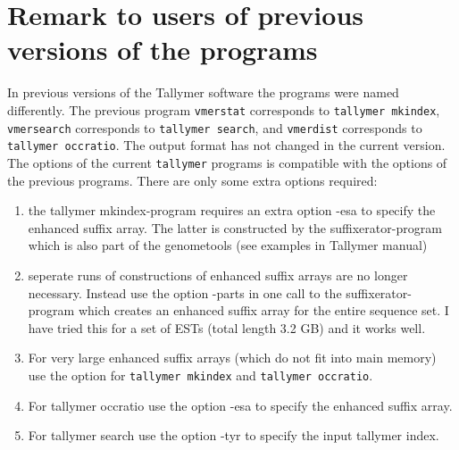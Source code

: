 \documentclass[12pt]{article}
\newcommand{\Programname}[1]{\texttt{\small #1}}
\newcommand{\Tallymer}[0]{\Programname{tallymer}\xspace}
\begin{document}
\section{Remark to users of previous versions of the programs}
In previous versions of the Tallymer software the programs were 
named differently. The previous program \texttt{vmerstat}
corresponds to \texttt{tallymer mkindex}, \texttt{vmersearch}
corresponds to \texttt{tallymer search}, and \texttt{vmerdist}
corresponds to \texttt{tallymer occratio}. The output format
has not changed in the current version. The options of the
current \Tallymer programs is compatible with the options of the
previous programs. There are only some extra options required:
\begin{enumerate}
\item
the tallymer mkindex-program requires an extra option -esa to
specify the enhanced suffix array. The latter is
constructed by the suffixerator-program which is also part
of the genometools (see examples in Tallymer manual)
\item
seperate runs of constructions of enhanced suffix arrays are no
longer necessary. Instead use the option -parts in one
call to the suffixerator-program which creates an enhanced suffix array
for the entire sequence set. I have tried this for a set of
ESTs (total length 3.2 GB) and it works well.
\item
For very large enhanced suffix arrays (which do not fit into main
memory) use the option  for \texttt{tallymer mkindex} and 
\texttt{tallymer occratio}.
\item 
For tallymer occratio use the option -esa to specify the enhanced suffix
array.
\item
For tallymer search use the option -tyr to specify the input tallymer
index.
\end{enumerate}
\end{document}
